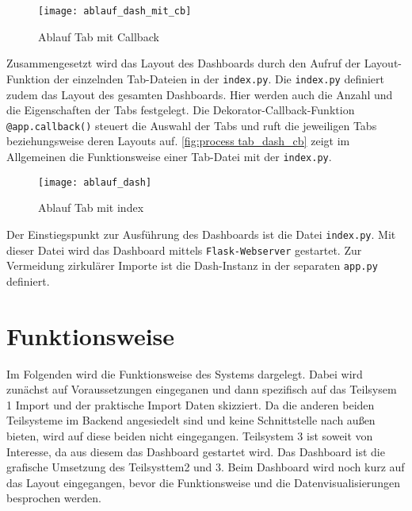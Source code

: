     \begin{figure}[H]
        \centering
            \texttt{[image: ablauf\_dash\_mit\_cb]}
            \caption{Ablauf Tab mit Callback}
            \label{fig:process tab_dash_cb}
    \end{figure}


    Zusammengesetzt wird das Layout des Dashboards durch den Aufruf der Layout-Funktion der einzelnden Tab-Dateien in der \texttt{index.py}.
    Die \texttt{index.py} definiert zudem das Layout des gesamten Dashboards. Hier werden auch die Anzahl und die Eigenschaften der Tabs festgelegt. 
    Die Dekorator-Callback-Funktion \texttt{@app.callback()} steuert die Auswahl der Tabs und ruft die jeweiligen Tabs beziehungsweise deren 
    Layouts auf. \autoref{fig:process tab_dash_cb} zeigt im Allgemeinen die Funktionsweise einer Tab-Datei mit der \texttt{index.py}.

    \begin{figure}[H]
        \centering
            \texttt{[image: ablauf\_dash]}
            \caption{Ablauf Tab mit index}
            \label{fig:process tab_dash_cb}
    \end{figure}

    Der Einstiegspunkt zur Ausführung des Dashboards ist die Datei \texttt{index.py}. Mit dieser Datei wird das Dashboard mittels \texttt{Flask-Webserver}
    gestartet. Zur Vermeidung zirkulärer Importe ist die Dash-Instanz in der separaten \texttt{app.py} definiert\cite[vgl.][]{plotly_url_2021}.



\section{Funktionsweise}

    Im Folgenden wird die Funktionsweise des Systems dargelegt. Dabei wird zunächst auf Voraussetzungen eingeganen und dann
    spezifisch auf das Teilsysem 1 Import und der
    praktische Import Daten skizziert. Da die anderen beiden Teilsysteme im Backend angesiedelt sind und keine Schnittstelle
    nach außen bieten, wird auf diese beiden nicht eingegangen. Teilsystem 3 ist soweit von Interesse, da aus diesem das Dashboard
    gestartet wird. Das Dashboard ist die grafische Umsetzung des Teilsysttem2 und 3. Beim Dashboard wird noch kurz auf das Layout
    eingegangen, bevor die Funktionsweise und die Datenvisualisierungen besprochen werden.



